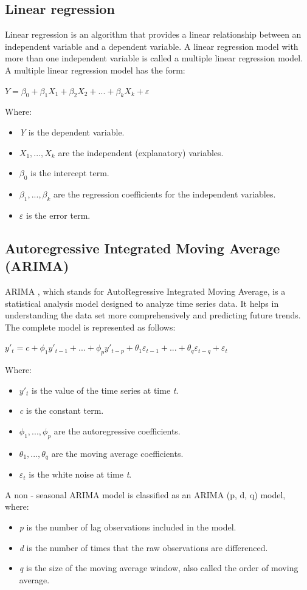 \documentclass{ieeeojies}
\begin{document}
\subsection{Linear regression}
Linear regression \cite{b6} is an algorithm that provides a linear relationship between an independent variable and a dependent variable. A linear regression model with more than one independent variable is called a multiple linear regression model. A multiple linear regression model has the form:
\newline  \centerline{$\textit{Y} = \beta_{0} + \beta_{1}X_{1} + \beta_{2}X_{2} + ... + \beta_{k}X_{k} + \varepsilon$}
\newline Where:
\begin{itemize}
	\item \textit{Y} is the dependent variable.
	\item $X_{1},...,X_{k}$ are the independent (explanatory) variables.
	\item $\beta_{0}$ is the intercept term.
	\item $\beta_{1},...,\beta_{k}$ are the regression coefficients for the independent variables.
	\item $\varepsilon$ is the error term.
\end{itemize}

\subsection{Autoregressive Integrated Moving Average (ARIMA)}
ARIMA \cite{b7}, which stands for AutoRegressive Integrated Moving Average, is a statistical analysis model designed to analyze time series data. It helps in understanding the data set more comprehensively and predicting future trends. The complete model is represented as follows:
\newline \centerline{$y'_{t} = c + \phi_{1}y'_{t-1} + ... + \phi_{p}y'_{t-p} + \theta_{1}\varepsilon_{t-1} + ... + \theta_{q}\varepsilon_{t-q} + \varepsilon_{t}$}
\newline Where:
\begin{itemize}
	\item $y'_{t}$ is the value of the time series at time \textit{t}.
	\item \textit{c} is the constant term.
	\item $\phi_{1},...,\phi_{p}$ are the autoregressive coefficients.
	\item $\theta_{1},...,\theta_{q}$ are the moving average coefficients.
	\item $\varepsilon_{t}$ is the white noise at time \textit{t}.
\end{itemize}
A non - seasonal ARIMA model is classified as an ARIMA (p, d, q) model, where:
\begin{itemize}
	\item \textit{p} is the number of lag observations included in the model.
	\item \textit{d} is the number of times that the raw observations are differenced.
	\item \textit{q} is the size of the moving average window, also called the order of moving average.
\end{itemize}
\end{document}
